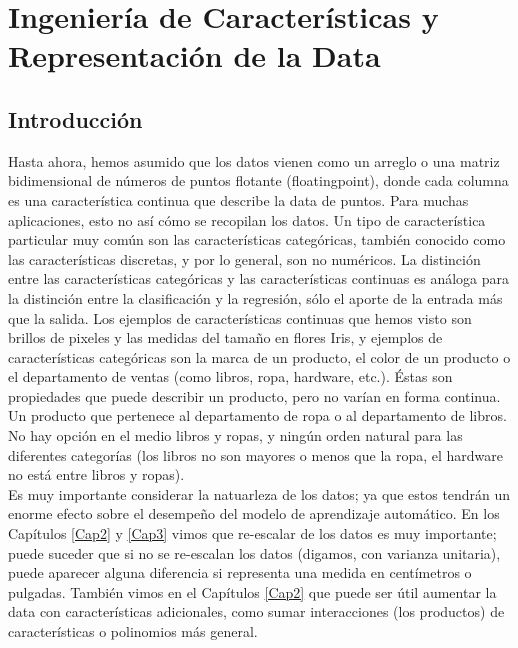 



\chapter{Ingeniería de Características y Representación de la Data}{\label{Cap4}}



\section{Introducción}



Hasta ahora, hemos asumido que los datos vienen como un    arreglo o una  matriz  bidimensional de números de puntos flotante (floatingpoint), donde cada columna es una característica continua que describe la data de puntos. Para muchas aplicaciones, esto no así  cómo se recopilan los datos.  Un tipo  de característica   particular  muy común son las características categóricas, también conocido como las características discretas, y  por lo general,  son no  numéricos.  La distinción entre las características categóricas y las características continuas es análoga para la distinción entre la clasificación y la regresión, sólo el  aporte de la  entrada más que  la salida. Los ejemplos de características continuas que hemos visto son  brillos de pixeles y las medidas del tamaño en flores Iris, y   ejemplos de características categóricas son la marca de un producto, el color de un producto o  el departamento de ventas (como libros, ropa, hardware, etc.).  Éstas son propiedades que puede describir un producto, pero no varían en forma continua. Un producto que pertenece  al departamento de ropa o al departamento de libros. No hay opción en el medio libros y ropas, y ningún orden natural para las diferentes categorías (los libros no son mayores o menos que la ropa, el hardware no está entre libros y ropas).\\

 Es muy importante considerar la natuarleza de los datos; ya que estos  tendrán un enorme efecto sobre el desempeño del modelo de aprendizaje  automático. En los Capítulos \ref{Cap2}  y \ref{Cap3} vimos que re-escalar de los datos es muy importante; puede suceder que si no se re-escalan los  datos (digamos, con  varianza  unitaria),   puede aparecer alguna diferencia  si representa una medida en centímetros o pulgadas.
 También vimos en el Capítulos \ref{Cap2}  que puede ser útil aumentar la data con características adicionales, como sumar interacciones (los productos) de características o polinomios más general.\\


